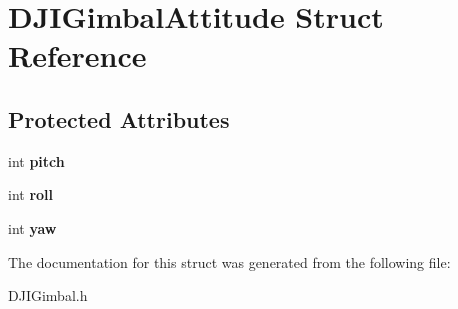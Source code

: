 \hypertarget{struct_d_j_i_gimbal_attitude}{\section{D\+J\+I\+Gimbal\+Attitude Struct Reference}
\label{struct_d_j_i_gimbal_attitude}
}
\subsection*{Protected Attributes}
\begin{DoxyCompactItemize}
\item 
\hypertarget{struct_d_j_i_gimbal_attitude_a22b3fa6e0ba757c1b9722e79a27e345f}{int {\bfseries pitch}}\label{struct_d_j_i_gimbal_attitude_a22b3fa6e0ba757c1b9722e79a27e345f}

\item 
\hypertarget{struct_d_j_i_gimbal_attitude_a3544ad6051f8e52a628c35909c8f76ba}{int {\bfseries roll}}\label{struct_d_j_i_gimbal_attitude_a3544ad6051f8e52a628c35909c8f76ba}

\item 
\hypertarget{struct_d_j_i_gimbal_attitude_a6c11f905229dbc99f098d6f3310a5cb0}{int {\bfseries yaw}}\label{struct_d_j_i_gimbal_attitude_a6c11f905229dbc99f098d6f3310a5cb0}

\end{DoxyCompactItemize}


The documentation for this struct was generated from the following file\+:\begin{DoxyCompactItemize}
\item 
D\+J\+I\+Gimbal.\+h\end{DoxyCompactItemize}
